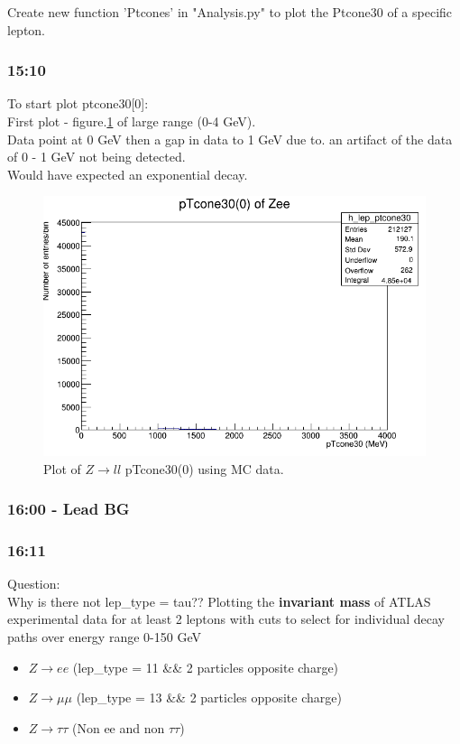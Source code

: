 Create new function 'Ptcones' in "Analysis.py" to plot the Ptcone30 of a specific lepton.

\subsubsection*{\textbf{15:10}}
To start plot ptcone30[0]:
\\
First plot - figure.\ref{fig:ptcone30_Zee_0-4GeV} of large range (0-4 GeV).\\
Data point at 0 GeV then a gap in data to 1 GeV due to. an artifact of the data of 0 - 1 GeV not being detected. \\
Would have expected an exponential decay.

\begin{figure}[h!]
    \centering
	\includegraphics[width=\linewidth]{plots/11-02-2021/Zee-fast_pTcone30(0)_ 0-4Gev_11-02-2021.png}
	\caption{Plot of $Z \rightarrow ll$ pTcone30(0) using MC data. 
	}\label{fig:ptcone30_Zee_0-4GeV}
\end{figure}


\subsubsection*{\textbf{16:00} - Lead BG}

\subsubsection*{\textbf{16:11}}
Question:\\
Why is there not lep\_type = tau??
Plotting the \textbf{invariant mass} of ATLAS experimental data for at least 2 leptons with cuts to select for individual decay paths over energy range 0-150 GeV
\begin{itemize}
    \item $Z \rightarrow ee$ (lep\_type = 11 \&\& 2 particles opposite charge)
    \item $Z \rightarrow \mu\mu$ (lep\_type = 13 \&\& 2 particles opposite charge)
    \item $Z \rightarrow \tau\tau$ (Non ee and non $\tau\tau$)
\end{itemize}


